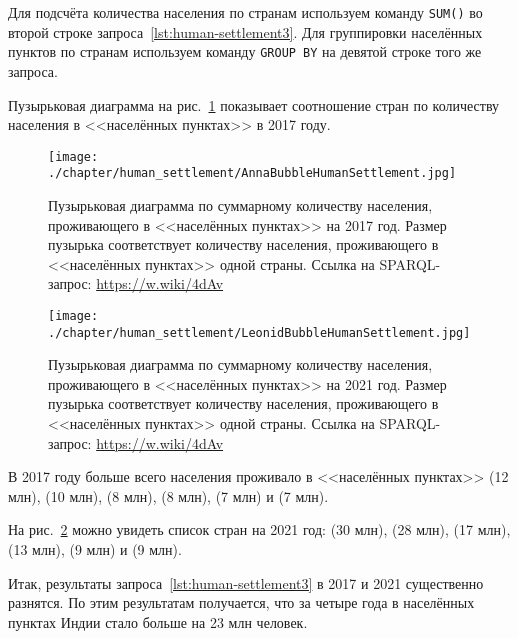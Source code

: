 Для подсчёта количества населения по странам 
используем команду \lstinline|SUM()| во второй строке запроса~\ref{lst:human-settlement3}. 
Для группировки населённых пунктов по странам 
используем команду \lstinline|GROUP BY| на девятой строке того же запроса.

Пузырьковая диаграмма на рис.~\ref{fig:human-settlement-1} 
показывает соотношение стран по количеству населения в <<населённых пунктах>> в 2017 году.

\begin{figure}
\centering
	\texttt{[image: ./chapter/human\_settlement/AnnaBubbleHumanSettlement.jpg]}
	\label{fig:human-settlement-1}
    \caption[Пузырьковая диаграмма  по суммарному количеству населения в населённых пунктах, 2017.]{Пузырьковая диаграмма  по суммарному количеству населения, проживающего в <<населённых пунктах>> на 2017 год. Размер пузырька соответствует количеству населения, проживающего в <<населённых пунктах>> одной страны. Ссылка на SPARQL-запрос: \href{https://w.wiki/4dAv}{https://w.wiki/4dAv}}
\end{figure}

\begin{figure}
\centering
	\texttt{[image: ./chapter/human\_settlement/LeonidBubbleHumanSettlement.jpg]}
	\label{fig:human-settlement-2}
	\caption[Пузырьковая диаграмма  по суммарному количеству населения в населённых пунктах, 2021.]{Пузырьковая диаграмма  по суммарному количеству населения, проживающего в <<населённых пунктах>> на 2021 год. Размер пузырька соответствует количеству населения, проживающего в <<населённых пунктах>> одной страны. Ссылка на SPARQL-запрос: \href{https://w.wiki/4dAv}{https://w.wiki/4dAv}}
\end{figure}

В 2017 году больше всего населения проживало в <<населённых пунктах>> 
 (\num{12} млн), 
 (\num{10} млн), 
 (\num{8} млн), 
 (\num{8} млн), 
 (\num{7} млн) и 
 (\num{7} млн). 

На рис.~\ref{fig:human-settlement-2} можно увидеть список стран на 2021 год: 
 (\num{30} млн), 
 (\num{28} млн), 
 (\num{17} млн), 
 (\num{13} млн), 
 (\num{9} млн) и 
 (\num{9} млн). 

Итак, результаты запроса~\ref{lst:human-settlement3} в 2017 и 2021 существенно разнятся. 
По этим результатам получается, что за четыре года 
в населённых пунктах Индии стало больше на 23 млн человек. 


